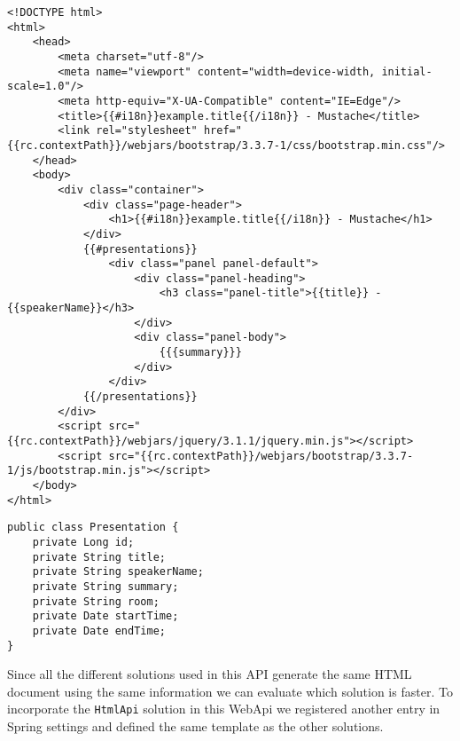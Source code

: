 \begin{minipage}{\linewidth}
\begin{lstlisting}[caption={Spring Benchmark Mustache Template},captionpos=b,label={lst:mustachespringtemplate}]
<!DOCTYPE html>
<html>
    <head>
        <meta charset="utf-8"/>
        <meta name="viewport" content="width=device-width, initial-scale=1.0"/>
        <meta http-equiv="X-UA-Compatible" content="IE=Edge"/>
        <title>{{#i18n}}example.title{{/i18n}} - Mustache</title>
        <link rel="stylesheet" href="{{rc.contextPath}}/webjars/bootstrap/3.3.7-1/css/bootstrap.min.css"/>
    </head>
    <body>
        <div class="container">
            <div class="page-header">
                <h1>{{#i18n}}example.title{{/i18n}} - Mustache</h1>
            </div>
            {{#presentations}}
                <div class="panel panel-default">
                    <div class="panel-heading">
                        <h3 class="panel-title">{{title}} - {{speakerName}}</h3>
                    </div>
                    <div class="panel-body">
                        {{{summary}}}
                    </div>
                </div>
            {{/presentations}}
        </div>
        <script src="{{rc.contextPath}}/webjars/jquery/3.1.1/jquery.min.js"></script>
        <script src="{{rc.contextPath}}/webjars/bootstrap/3.3.7-1/js/bootstrap.min.js"></script>
    </body>
</html>
\end{lstlisting}
\end{minipage}


\begin{minipage}{\linewidth}
\begin{lstlisting}[caption={Spring Benchmark Presentation Object},captionpos=b,label={lst:presentationobject}]
public class Presentation {
    private Long id;
    private String title;
    private String speakerName;
    private String summary;
    private String room;
    private Date startTime;
    private Date endTime;
}
\end{lstlisting}
\end{minipage}

\noindent
Since all the different solutions used in this \ac{API} generate the same \ac{HTML} document using the same information we can evaluate which solution is faster. To incorporate the \texttt{HtmlApi} solution in this WebApi we registered another entry in Spring settings and defined the same template as the other solutions. 

